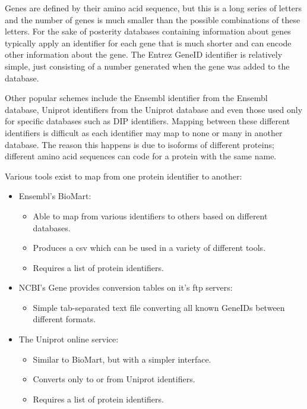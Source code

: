 \begin{itemize}
Genes are defined by their amino acid sequence, but this is a long series of letters and the number of genes is much smaller than the possible combinations of these letters.
For the sake of posterity databases containing information about genes typically apply an identifier for each gene that is much shorter and can encode other information about the gene.
The Entrez GeneID identifier is relatively simple, just consisting of a number generated when the gene was added to the database\cite{maglott_entrez_2006}.

Other popular schemes include the Ensembl identifier from the Ensembl database\cite{ensembl_website}, Uniprot identifiers from the Uniprot database\cite{uniprot_website} and even those used only for specific databases such as DIP identifiers\cite{dip_website}.
Mapping between these different identifiers is difficult as each identifier may map to none or many in another database.
The reason this happens is due to isoforms of different proteins; different amino acid sequences can code for a protein with the same name.


Various tools exist to map from one protein identifier to another:

\begin{itemize}
    \item Ensembl's BioMart\cite{smedley_biomart_2009}:
        \begin{itemize}
            \item Able to map from various identifiers to others based on different databases.
            \item Produces a csv which can be used in a variety of different tools.
            \item Requires a list of protein identifiers.
        \end{itemize}
    \item NCBI's Gene\cite{maglott_entrez_2006} provides conversion tables on it's ftp servers:
        \begin{itemize}
            \item Simple tab-separated text file converting all known GeneIDs between different formats.
        \end{itemize}
    \item The Uniprot\cite{consortium_universal_2007} online service:
        \begin{itemize}
            \item Similar to BioMart, but with a simpler interface.
            \item Converts only to or from Uniprot identifiers.
            \item Requires a list of protein identifiers.
        \end{itemize}
\end{itemize}


\end{itemize}
